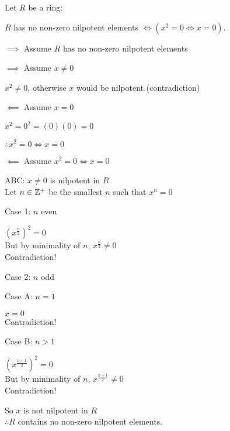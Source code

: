 \documentclass[letterpaper,12pt,fleqn]{article}
\begin{document}
\begin{theorem}
  Let $R$ be a ring:

  $R$ has no non-zero nilpotent elements $\iff \left(x^2=0\iff x=0\right)$.
\end{theorem}
\newpage
\begin{theproof}
  \listbreak
  \begin{description}
  \item $\implies$ Assume $R$ has no non-zero nilpotent elements
    \begin{description}
    \item $\implies$ Assume $x\ne0$

      $x^2\ne0$, otherwise $x$ would be nilpotent (contradiction)

    \item $\impliedby$ Assume $x=0$

      $x^2=0^2=(0)(0)=0$
    \end{description}
    
    $\therefore x^2=0\iff x=0$

  \item $\impliedby$ Assume $x^2=0\iff x=0$

    ABC: $x\ne0$ is nilpotent in $R$ \\
    Let $n\in\mathbb{Z}^+$ be the smallest $n$ such that $x^n=0$
    \begin{description}
    \item Case 1: $n$ even

      $\left(x^{\frac{n}{2}}\right)^2=0$ \\
      But by minimality of $n$, $x^{\frac{n}{2}}\ne0$ \\
      Contradiction!
      
    \item Case 2: $n$ odd
      \begin{description}
      \item Case A: $n=1$

        $x=0$ \\
        Contradiction!

      \item Case B: $n>1$
        
        $\left(x^{\frac{n+1}{2}}\right)^2=0$ \\
        But by minimality of $n$, $x^{\frac{n+1}{2}}\ne0$ \\
        Contradiction!
      \end{description}
    \end{description}

    So $x$ is not nilpotent in $R$ \\
    $\therefore R$ contains no non-zero nilpotent elements.
  \end{description}
\end{theproof}
\end{document}
